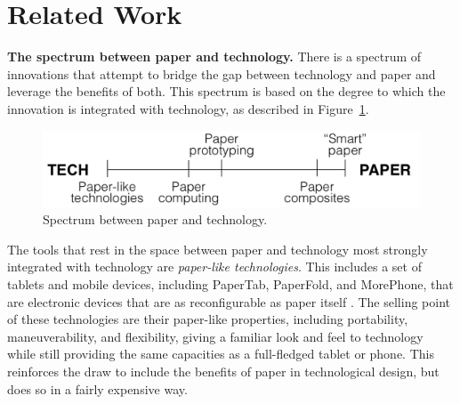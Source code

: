 \documentclass{sig-alternate}
\begin{document}


\section{Related Work}

\textbf{The spectrum between paper and technology.} There is a spectrum of innovations that attempt to bridge the gap between technology and paper and leverage the benefits of both. This spectrum is based on the degree to which the innovation is integrated with technology, as described in Figure~\ref{fig:spectrum}.

\begin{figure}
\centering
\includegraphics[width=\linewidth]{img/spectrum.png}
\caption{Spectrum between paper and technology.}
\label{fig:spectrum}
\end{figure}



The tools that rest in the space between paper and technology most strongly integrated with technology are \emph{paper-like technologies}. This includes a set of tablets and mobile devices, including PaperTab, PaperFold, and MorePhone, that are electronic devices that are as reconfigurable as paper itself \cite{gomes2014,gomes2013,tarun2013}. The selling point of these technologies are their paper-like properties, including portability, maneuverability, and flexibility, giving a familiar look and feel to technology while still providing the same capacities as a full-fledged tablet or phone. This reinforces the draw to include the benefits of paper in technological design, but does so in a fairly expensive way. 
\end{document}
